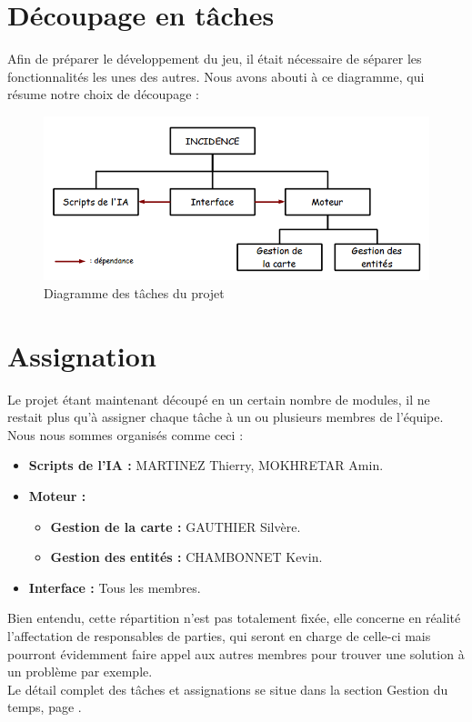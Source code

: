 \documentclass[a4paper]{memoir}
\begin{document}
		\section{Découpage en tâches}
			Afin de préparer le développement du jeu, il était nécessaire de séparer les fonctionnalités les unes des autres. Nous avons abouti à ce diagramme, qui résume notre choix de découpage :\\
			\begin{figure}[H]
				\begin{center}
					\includegraphics[scale=0.5]{img/DiagrammeDecoupageProjet.png}
				\end{center}
				\label{fig:decoupage}
				\caption{Diagramme des tâches du projet}
			\end{figure}

		\section{Assignation}
			Le projet étant maintenant découpé en un certain nombre de modules, il ne restait plus qu'à assigner chaque tâche à un ou plusieurs membres de l'équipe. Nous nous sommes organisés comme ceci :
			\begin{itemize}[label=$\bullet$]
				\item \textbf{Scripts de l'IA :} MARTINEZ Thierry, MOKHRETAR Amin.
				\item \textbf{Moteur :}
				\begin{itemize}[label=$\bullet$]
					\item \textbf{Gestion de la carte :} GAUTHIER Silvère.
					\item \textbf{Gestion des entités :} CHAMBONNET Kevin.
				\end{itemize}
				\item \textbf{Interface :} Tous les membres.
			\end{itemize}
			Bien entendu, cette répartition n'est pas totalement fixée, elle concerne en réalité l'affectation de responsables de parties, qui seront en charge de celle-ci mais pourront évidemment faire appel aux autres membres pour trouver une solution à un problème par exemple.\\
			Le détail complet des tâches et assignations se situe dans la section Gestion du temps, page \pageref{GestionTps}.
\end{document}
